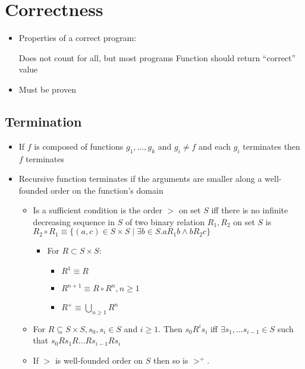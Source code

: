 
\section{Correctness}
\begin{itemize}
    \item Properties of a correct program:
        \begin{itemize}
             Does not count for all, but most programs
             Function should return ``correct'' value
        \end{itemize}
    \item Must be proven
\end{itemize}

\subsection{Termination}
\begin{itemize}
    \item If $f$ is composed of functions $g_1, \dots , g_k$ and $g_i \neq f$ and each $g_i$ terminates then $f$ terminates
    \item Recursive function terminates if the arguments are smaller along a well-founded order on the function's domain
        \begin{itemize}
            \item Is a sufficient condition
             is the order $>$ on set $S$ iff there is no infinite decreasing sequence in $S$
             of two binary relation $R_1, R_2$ on set $S$ is $R_2 \circ R_1 \equiv \{(a, c) \in S \times S \mid \exists b \in S. a R_1 b \wedge b R_2 c\}$
                \begin{itemize}
                    \item For $R \subset S \times S$:
                        \begin{itemize}
                            \item $R^1 \equiv R$
                            \item $R^{n + 1} \equiv R \circ R^n, n \ge 1$
                            \item $R^+ \equiv \bigcup_{n \ge 1} R^n$
                        \end{itemize}
                \end{itemize}
            \item For $R \subseteq S \times S, s_0, s_i \in S$ and $i \ge 1$. Then $s_0 R^i s_i$ iff $\exists s_1, \dots s_{i-1} \in S$ such that $s_0 R s_1 R \dots R s_{i-1} R s_i$
            \item If $>$ is well-founded order on $S$ then so is $>^+$.
        \end{itemize}
\end{itemize}

